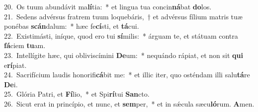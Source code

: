 {20.~}Os tuum abundávit ma\textbf{lí}tia:~* et lingua tua concin\textbf{ná}bat \textbf{do}los.\\
{21.~}Sedens advérsus fratrem tuum loquebáris,~† et advérsus fílium matris tuæ ponébas \textbf{scán}dalum:~* hæc fe\textbf{cí}sti, et \textbf{tá}cui.\\
{22.~}Existimásti, iníque, quod ero tui \textbf{sí}milis:~* árguam te, et státuam contra \textbf{fá}ciem \textbf{tu}am.\\
{23.~}Intellígite hæc, qui obliviscímini \textbf{De}um:~* nequándo rápiat, et non sit \textbf{qui} e\textbf{rí}piat.\\
{24.~}Sacrifícium laudis honorifi\textbf{cá}bit me:~* et illic iter, quo osténdam illi salu\textbf{tá}re \textbf{De}i.\\
{25.~}Glória Patri, et \textbf{Fí}lio,~* et Spi\textbf{rí}tui \textbf{San}cto.\\
{26.~}Sicut erat in princípio, et nunc, et \textbf{sem}per,~* et in sǽcula sæcu\textbf{ló}rum. \textbf{A}men.\\
